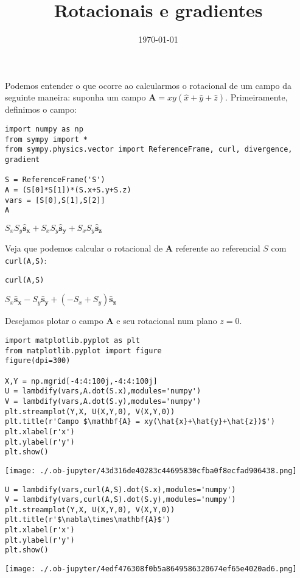 \documentclass[11pt]{article}
\date{\today}
\title{Rotacionais e gradientes}
\begin{document}
\maketitle
Podemos entender o que ocorre ao calcularmos o rotacional de um campo da
seguinte maneira: suponha um campo \(\mathbf A = xy(\hat x+\hat y+\hat
z)\). Primeiramente, definimos o campo:

\begin{verbatim}
import numpy as np
from sympy import *
from sympy.physics.vector import ReferenceFrame, curl, divergence, gradient

S = ReferenceFrame('S')
A = (S[0]*S[1])*(S.x+S.y+S.z)
vars = [S[0],S[1],S[2]]
A
\end{verbatim}

$\displaystyle S_{x} S_{y}\mathbf{\hat{s}_x} + S_{x} S_{y}\mathbf{\hat{s}_y} + S_{x} S_{y}\mathbf{\hat{s}_z}$

Veja que podemos calcular o rotacional de \(\mathbf A\) referente ao
referencial \(S\) com \texttt{curl(A,S)}:
\begin{verbatim}
curl(A,S)
\end{verbatim}

$\displaystyle S_{x}\mathbf{\hat{s}_x} -  S_{y}\mathbf{\hat{s}_y} + (- S_{x} + S_{y})\mathbf{\hat{s}_z}$

Desejamos plotar o campo \(\mathbf A\) e seu rotacional num plano \(z=0\). 
\begin{verbatim}
import matplotlib.pyplot as plt
from matplotlib.pyplot import figure
figure(dpi=300)

X,Y = np.mgrid[-4:4:100j,-4:4:100j]
U = lambdify(vars,A.dot(S.x),modules='numpy')
V = lambdify(vars,A.dot(S.y),modules='numpy')
plt.streamplot(Y,X, U(X,Y,0), V(X,Y,0))
plt.title(r'Campo $\mathbf{A} = xy(\hat{x}+\hat{y}+\hat{z})$')
plt.xlabel(r'x')
plt.ylabel(r'y')
plt.show()
\end{verbatim}

\begin{center}
\texttt{[image: ./.ob-jupyter/43d316de40283c44695830cfba0f8ecfad906438.png]}
\end{center}
\begin{verbatim}
U = lambdify(vars,curl(A,S).dot(S.x),modules='numpy')
V = lambdify(vars,curl(A,S).dot(S.y),modules='numpy')
plt.streamplot(Y,X, U(X,Y,0), V(X,Y,0))
plt.title(r'$\nabla\times\mathbf{A}$')
plt.xlabel(r'x')
plt.ylabel(r'y')
plt.show()
\end{verbatim}

\begin{center}
\texttt{[image: ./.ob-jupyter/4edf476308f0b5a8649586320674ef65e4020ad6.png]}
\end{center}
\end{document}
